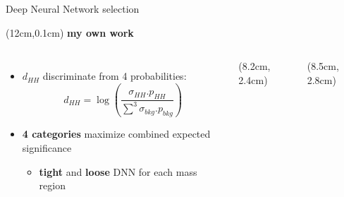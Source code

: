 \begin{frame}{Deep Neural Network selection}
\begin{textblock*}{5cm}(12cm,0.1cm) %
   \textcolor{HHred}{\Large\textbf{my own work}}
\end{textblock*}
\begin{columns}
\begin{itemize}
    \item $d_{HH}$ discriminate from 4 probabilities: 
    \begin{equation*}
        d_{HH} = \log(\frac{\sigma_{HH}.p_{HH}}{\sum^{3}{\sigma_{bkg}.p_{bkg}}})
    \end{equation*}
    \item \textbf{\textcolor{HHred}{4 categories}} maximize combined expected significance 
    \begin{itemize}
        \item \textbf{tight} and \textbf{loose} DNN for each mass region
    \end{itemize}
\end{itemize}

\begin{textblock*}{5cm}(8.2cm, 2.4cm) %
\end{textblock*}

\begin{textblock*}{5cm}(8.5cm, 2.8cm)  
\end{textblock*}


\end{columns}
\end{frame}
